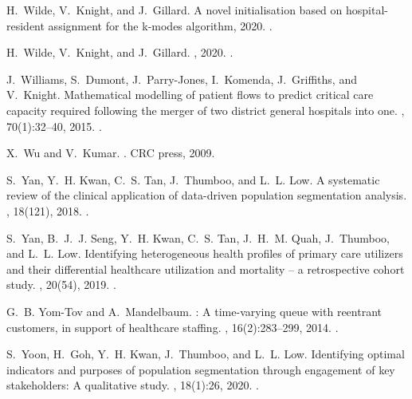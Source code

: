 \documentclass[11pt]{article}
\begin{document}
\begin{thebibliography}{10}
H.~Wilde, V.~Knight, and J.~Gillard.
\newblock A novel initialisation based on hospital-resident assignment for the
  k-modes algorithm, 2020.
\newblock \href {http://arxiv.org/abs/2002.02701} {}.

H.~Wilde, V.~Knight, and J.~Gillard.
, 2020.
\newblock \href {https://doi.org/10.5281/zenodo.3908167}
  {}.

J.~Williams, S.~Dumont, J.~Parry-Jones, I.~Komenda, J.~Griffiths, and
  V.~Knight.
\newblock Mathematical modelling of patient flows to predict critical care
  capacity required following the merger of two district general hospitals into
  one.
, 70(1):32--40, 2015.
\newblock \href {https://doi.org/10.1111/anae.12839}
  {}.

X.~Wu and V.~Kumar.
.
\newblock CRC press, 2009.

S.~Yan, Y.~H. Kwan, C.~S. Tan, J.~Thumboo, and L.~L. Low.
\newblock A systematic review of the clinical application of data-driven
  population segmentation analysis.
, 18(121), 2018.
\newblock \href {https://doi.org/10.1186/s12874-018-0584-9}
  {}.

S.~Yan, B.~J.~J. Seng, Y.~H. Kwan, C.~S. Tan, J.~H.~M. Quah, J.~Thumboo, and
  L.~L. Low.
\newblock Identifying heterogeneous health profiles of primary care utilizers
  and their differential healthcare utilization and mortality – a
  retrospective cohort study.
, 20(54), 2019.
\newblock \href {https://doi.org/10.1186/s12875-019-0939-2}
  {}.

G.~B. Yom-Tov and A.~Mandelbaum.
: A time-varying queue with reentrant customers, in support
  of healthcare staffing.
, 16(2):283--299,
  2014.
\newblock \href {https://doi.org/10.1287/msom.2013.0474}
  {}.

S.~Yoon, H.~Goh, Y.~H. Kwan, J.~Thumboo, and L.~L. Low.
\newblock Identifying optimal indicators and purposes of population
  segmentation through engagement of key stakeholders: A qualitative study.
, 18(1):26, 2020.
\newblock \href {https://doi.org/10.1186/s12961-019-0519-x}
  {}.

\end{thebibliography}
\end{document}
